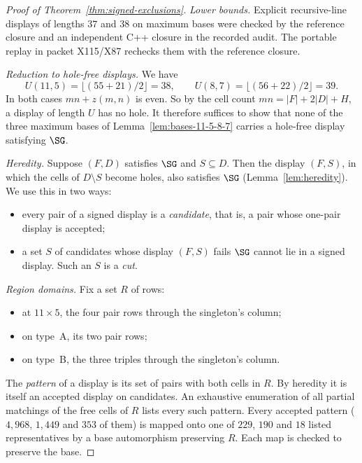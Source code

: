 \begin{proof}[Proof of Theorem~\ref{thm:signed-exclusions}]
\emph{Lower bounds.} Explicit recursive-line displays of lengths $37$ and
$38$ on maximum bases were checked by the reference closure and an
independent C++ closure in the recorded audit. The portable replay in
packet X115/X87 rechecks them with the reference closure.

\emph{Reduction to hole-free displays.} We have
\[
U(11,5)=\lfloor(55+21)/2\rfloor=38,\qquad U(8,7)=\lfloor(56+22)/2\rfloor=39 .
\]
In both cases $mn+z(m,n)$ is even. So by the cell count
$mn=|F|+2|D|+H$, a display of length $U$ has no hole. It therefore
suffices to show that none of the three maximum bases of
Lemma~\ref{lem:bases-11-5-8-7} carries a hole-free display satisfying
$\SG$.

\emph{Heredity.} Suppose $(F,D)$ satisfies $\SG$ and $S\subseteq D$. Then
the display $(F,S)$, in which the cells of $D\setminus S$ become holes,
also satisfies $\SG$ (Lemma~\ref{lem:heredity}). We use this in two
ways:
\begin{itemize}
\item every pair of a signed display is a \emph{candidate}, that is, a
      pair whose one-pair display is accepted;
\item a set $S$ of candidates whose display $(F,S)$ fails $\SG$ cannot lie
      in a signed display. Such an $S$ is a \emph{cut}.
\end{itemize}

\emph{Region domains.} Fix a set $R$ of rows:
\begin{itemize}
\item at $11\times5$, the four pair rows through the singleton's column;
\item on type~A, its two pair rows;
\item on type~B, the three triples through the singleton's column.
\end{itemize}
The \emph{pattern} of a display is its set of pairs with both cells in
$R$. By heredity it is itself an accepted display on candidates. An
exhaustive enumeration of all partial matchings of the free cells of $R$
lists every such pattern. Every accepted pattern ($4{,}968$, $1{,}449$
and $353$ of them) is mapped onto one of $229$, $190$ and $18$ listed
representatives by a base automorphism preserving $R$. Each map is checked
to preserve the base.


\end{proof}
